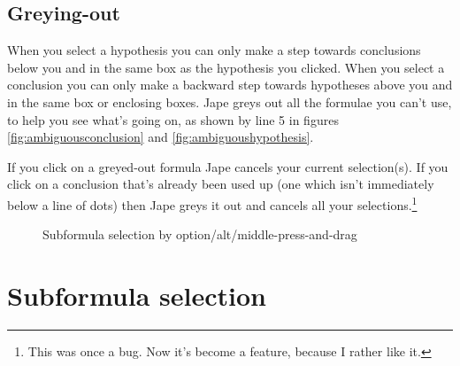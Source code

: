 \documentclass[11pt]{book}
\begin{document}
\subsection{Greying-out}

When you select a hypothesis you can only make a step towards conclusions below you and in the same box as the hypothesis you clicked. When you select a conclusion you can only make a backward step towards hypotheses above you and in the same box or enclosing boxes. Jape greys out all the formulae you can't use, to help you see what's going on, as shown by line 5 in figures \ref{fig:ambiguousconclusion} and \ref{fig:ambiguoushypothesis}. 

If you click on a greyed-out formula Jape cancels your current selection(s). If you click on a conclusion that's already been used up (one which isn't immediately below a line of dots) then Jape greys it out and cancels all your selections.\footnote{This was once a bug. Now it's become a feature, because I rather like it.}

\begin{figure}
\centering
{}
\quad
{}
\caption{Subformula selection by option/alt/middle-press-and-drag}
\end{figure}

\section{Subformula selection}
\label{sec:subformulaselection}
\end{document}
